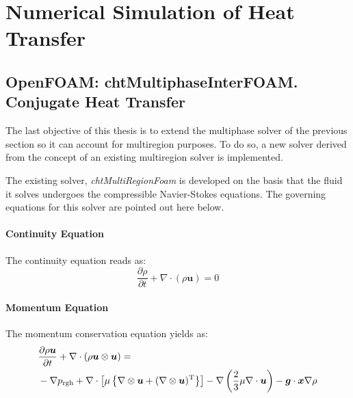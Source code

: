 \chapter{Numerical Simulation of Heat Transfer} %

\label{Chapter4}

\section{OpenFOAM: chtMultiphaseInterFOAM. Conjugate Heat Transfer}
\setlength{\parindent}{0.5cm} The last objective of this thesis is to extend the multiphase solver of the previous section so it can account for multiregion purposes. To do so, a new solver derived from the concept of an existing multiregion solver is implemented. 

\noindent The existing solver, \textit{chtMultiRegionFoam} is developed on the basis that the fluid it solves undergoes the compressible Navier-Stokes equations. The governing equations for this solver are pointed out here below.
\subsubsection*{Continuity Equation}
The continuity equation reads as:
\begin{equation}
	\frac{\partial \rho}{\partial t}+\nabla \cdot(\rho \boldsymbol{u})=0
	\label{4.1}
\end{equation}
\subsubsection*{Momentum Equation}
The momentum conservation equation yields as:
\begin{equation}
	\begin{aligned}
		&\frac{\partial \rho \boldsymbol{u}}{\partial t}+\nabla \cdot(\rho \boldsymbol{u} \otimes \boldsymbol{u})=\\
		&-\nabla p_{\mathrm{rgh}}+\nabla \cdot\left[\mu\left\{\nabla \otimes \boldsymbol{u}+(\nabla \otimes \boldsymbol{u})^{\mathrm{T}}\right\}\right]
		-\nabla\left(\frac{2}{3} \mu \nabla \cdot \boldsymbol{u}\right)-\boldsymbol{g} \cdot \boldsymbol{x} \nabla \rho
	\end{aligned}
	\centering
	\label{4.2}
\end{equation}

